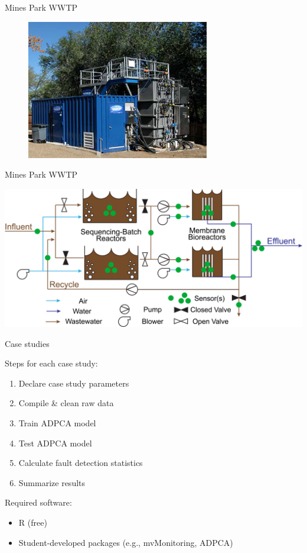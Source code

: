 \documentclass{beamer}
\providecommand{\tightlist}{%
  \setlength{\itemsep}{0pt}\setlength{\parskip}{0pt}}
\begin{document}
\begin{frame}{Mines Park WWTP}
\protect\hypertarget{mines-park-wwtp}{}

\begin{figure}
   \includegraphics{images/sbmbr.png}
\end{figure}

\end{frame}

\begin{frame}{Mines Park WWTP}
\protect\hypertarget{mines-park-wwtp-1}{}

\includegraphics{images/sbmbr_flow_diagram.png}

\end{frame}

\begin{frame}{Case studies}
\protect\hypertarget{case-studies}{}

Steps for each case study:

\begin{enumerate}
\tightlist
\item
  Declare case study parameters
\item
  Compile \& clean raw data
\item
  Train ADPCA model
\item
  Test ADPCA model
\item
  Calculate fault detection statistics
\item
  Summarize results
\end{enumerate}

Required software:

\begin{itemize}
\tightlist
\item
  R (free)
\item
  Student-developed packages (e.g., mvMonitoring, ADPCA)
\end{itemize}

\end{frame}
\end{document}
